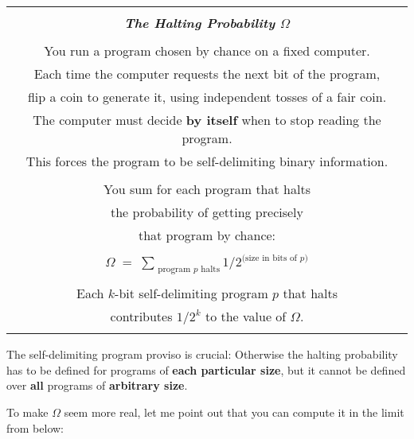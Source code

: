 \documentclass[12pt]{book}
\begin{document}
\begin{center}
\begin{tabular}{|c|}
\hline
\\
\textbf{\emph{\large The Halting Probability $\Omega$}}
\\ \\
You run a program chosen by chance on a fixed computer.
\\
Each time the computer requests the next bit of the program,
\\
flip a coin to generate it, using independent tosses of a fair coin.
\\
The computer must decide 
\textbf{by itself} when to stop reading the program.
\\
This forces the program to be self-delimiting binary information.
\\ \\
You sum for each program that halts 
\\
the probability of getting precisely
\\
that program by chance:
\\ \\
{\large $\Omega \; = \; \sum_{\mbox{ program $p$ halts}} 1/2^{\mbox{(size in bits of $p$)}}$}
\\ \\
Each $k$-bit self-delimiting program $p$ that halts
\\
contributes $1/2^k$ to the value of $\Omega$.
\\
\\
\hline
\end{tabular}
\end{center}
 
The self-delimiting program proviso is crucial: Otherwise the halting probability
has to be defined for programs of \textbf{each particular size}, but it cannot be defined
over \textbf{all} programs of \textbf{arbitrary size}.
 
To make $\Omega$ seem more real, let me point out that you can compute it in the limit
from below:
 
\end{document}
